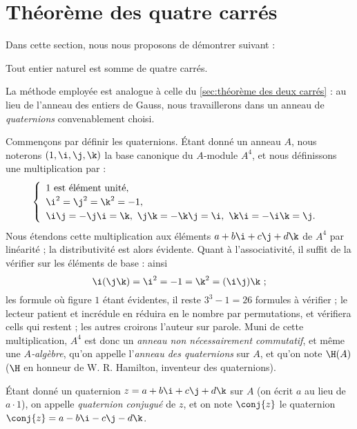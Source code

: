 \documentclass[11pt, %
  title in boldface,
  theorem in new line,
  theorem numbering = section,
  number theorems separately,
  simple name,
]{beaulivre}
\begin{document}
\section{Théorème des quatre carrés}\label{sec:théorème des quatre carrés}

    Dans cette section, nous nous proposons de démontrer  suivant :
    \begin{theorem}[Lagrange]\label{thm:Lagrange;somme des quatre carrés}
        Tout entier naturel est somme de quatre carrés.
    \end{theorem}

    La méthode employée est analogue à celle du \cref{sec:théorème des deux carrés} : au lieu de l'anneau des entiers de Gauss, nous travaillerons dans un anneau de \emph{quaternions} convenablement choisi.

    Commençons par définir les quaternions. Étant donné un anneau \( A \), nous noterons \( (1,\i,\j,\k) \) la base canonique du \( A \)‑module \( A^4 \), et nous définissons une multiplication par :
    \begin{equation}\label{eq:quaternion}
        \begin{cases}
            \enspace \text{\( 1 \) est élément unité},\\
            \enspace \i^2 = \j^2 = \k^2 = -1,\\
            \enspace \i\j = -\j\i = \k, ~ \j\k=-\k\j = \i, ~ \k\i = -\i\k = \j.
        \end{cases}
    \end{equation}
    Nous étendons cette multiplication aux éléments \( a+b\i+c\j+d\k \) de \( A^4 \) par linéarité ; la distributivité est alors évidente. Quant à l'associativité, il suffit de la vérifier sur les éléments de base : ainsi
    \[
        \i(\j\k) = \i^2 = -1 = \k^2 = (\i\j)\k ~;
    \]
    les formule où figure \( 1 \) étant évidentes, il reste \( 3^3-1 = 26 \) formules à vérifier ; le lecteur patient et incrédule en réduira en le nombre par permutations, et vérifiera cells qui restent ; les autres croirons l'auteur sur parole. Muni de cette multiplication, \( A^4 \) est donc un \emph{anneau non nécessairement commutatif}, et même une \emph{\( A \)‑algèbre}, qu'on appelle l'\emph{anneau des quaternions} sur \( A \), et qu'on note \( \H(A) \) (\( \H \) en honneur de W. R. Hamilton, inventeur des quaternions).

    Étant donné un quaternion \( z = a+b\i+c\j+d\k \) sur \( A \) (on écrit \( a \) au lieu de \( a \cdot 1 \)), on appelle \emph{quaternion conjugué} de \( z \), et on note \( \conj{z} \) le quaternion \( \conj{z} = a-b\i-c\j-d\k \).
\end{document}
